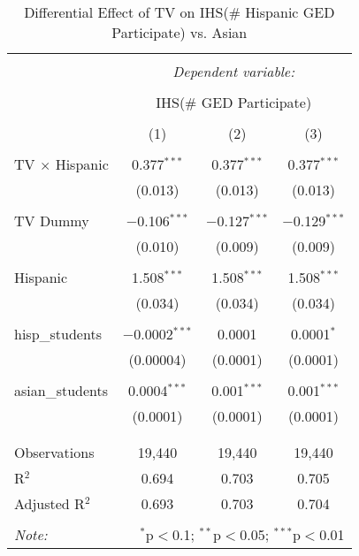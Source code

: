 
\begin{table}[!htbp] \centering 
  \caption{Differential Effect of TV on IHS(\# Hispanic GED Participate) vs. Asian} 
  \label{} 
\begin{tabular}{@{\extracolsep{-2pt}}lccc} 
\\[-1.8ex]\hline 
\hline \\[-1.8ex] 
 & \multicolumn{3}{c}{\textit{Dependent variable:}} \\ 
\cline{2-4} 
\\[-1.8ex] & \multicolumn{3}{c}{IHS(\# GED Participate)} \\ 
\\[-1.8ex] & (1) & (2) & (3)\\ 
\hline \\[-1.8ex] 
 TV $\times$ Hispanic & 0.377$^{***}$ & 0.377$^{***}$ & 0.377$^{***}$ \\ 
  & (0.013) & (0.013) & (0.013) \\ 
  & & & \\ 
 TV Dummy & $-$0.106$^{***}$ & $-$0.127$^{***}$ & $-$0.129$^{***}$ \\ 
  & (0.010) & (0.009) & (0.009) \\ 
  & & & \\ 
 Hispanic & 1.508$^{***}$ & 1.508$^{***}$ & 1.508$^{***}$ \\ 
  & (0.034) & (0.034) & (0.034) \\ 
  & & & \\ 
 hisp\_students & $-$0.0002$^{***}$ & 0.0001 & 0.0001$^{*}$ \\ 
  & (0.00004) & (0.0001) & (0.0001) \\ 
  & & & \\ 
 asian\_students & 0.0004$^{***}$ & 0.001$^{***}$ & 0.001$^{***}$ \\ 
  & (0.0001) & (0.0001) & (0.0001) \\ 
  & & & \\ 
\hline \\[-1.8ex] 
Observations & 19,440 & 19,440 & 19,440 \\ 
R$^{2}$ & 0.694 & 0.703 & 0.705 \\ 
Adjusted R$^{2}$ & 0.693 & 0.703 & 0.704 \\ 
\hline 
\hline \\[-1.8ex] 
\textit{Note:}  & \multicolumn{3}{r}{$^{*}$p$<$0.1; $^{**}$p$<$0.05; $^{***}$p$<$0.01} \\ 
\end{tabular} 
\end{table} 
